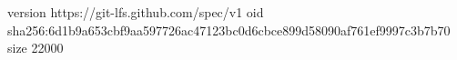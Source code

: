 version https://git-lfs.github.com/spec/v1
oid sha256:6d1b9a653cbf9aa597726ac47123bc0d6cbce899d58090af761ef9997c3b7b70
size 22000

